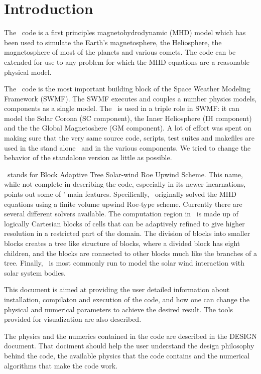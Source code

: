 \chapter{Introduction \label{chapter:introduction}}

The \BATSRUS\ code is a first principles magnetohydrodynamic (MHD)
model which has been used to simulate the Earth's magnetosphere, the
Heliosphere, the magnetosphere of most of the planets and various comets.  
The code can be extended for use to any problem for which the MHD equations
are a reasonable physical model.

The \BATSRUS\ code is the most important building block of the Space
Weather Modeling Framework (SWMF). The SWMF executes and couples a
number physics models, components as a single model.  The \BATSRUS\ is
used in a triple role in SWMF: it can model the Solar Corona (SC
component), the Inner Heliosphere (IH component) and the the Global
Magnetoshere (GM component).  A lot of effort was spent on making sure
that the very same source code, scripts, test suites and makefiles are
used in the stand alone \BATSRUS\ and in the various components.  We
tried to change the behavior of the standalone version as little as
possible.

\BATSRUS\ stands for Block Adaptive Tree Solar-wind Roe Upwind Scheme.
This name, while not complete in describing the code, especially in
its newer incarnations, points out some of \BATSRUS' main features.
Specifically, \BATSRUS\ originally solved the MHD equations using a
finite volume upwind Roe-type scheme.  Currently there are several
different solvers available.  The computation region in \BATSRUS\ is
made up of logically Cartesian blocks of cells that can be adaptively
refined to give higher resolution in a restricted part of the domain.
The division of blocks into smaller blocks creates a tree like
structure of blocks, where a divided block has eight children, and the
blocks are connected to other blocks much like the branches of a tree.
Finally, \BATSRUS\ is most commonly run to model the solar wind
interaction with solar system bodies.

This document is aimed at providing the user detailed information about
installation, compilaton and execution of the code, and 
how one can change the physical and numerical parameters
to achieve the desired result. The tools provided for visualization
are also described.

The physics and the numerics contained in the code are described in
the DESIGN document. That dociment should help
the user understand the design philosophy behind the code, the 
available physics that the code contains and the numerical algorithms that
make the code work. 

